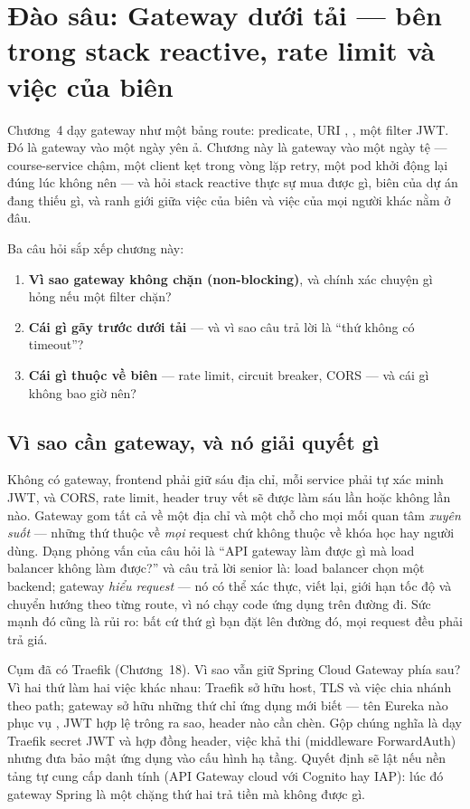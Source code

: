 \chapter{Đào sâu: Gateway dưới tải --- bên trong stack reactive, rate limit và việc của biên}
\label{ch:dd-gateway}

Chương~4 dạy gateway như một bảng route: predicate, URI ,
, một filter JWT. Đó là gateway vào một ngày yên ả.
Chương này là gateway vào một ngày tệ --- course-service chậm, một
client kẹt trong vòng lặp retry, một pod khởi động lại đúng lúc không
nên --- và hỏi stack reactive thực sự mua được gì, biên của dự án đang
thiếu gì, và ranh giới giữa việc của biên và việc của mọi người khác
nằm ở đâu.

Ba câu hỏi sắp xếp chương này:

\begin{enumerate}
  \item \textbf{Vì sao gateway không chặn (non-blocking)}, và chính
  xác chuyện gì hỏng nếu một filter chặn?
  \item \textbf{Cái gì gãy trước dưới tải} --- và vì sao câu trả lời là
  ``thứ không có timeout''?
  \item \textbf{Cái gì thuộc về biên} --- rate limit, circuit breaker,
  CORS --- và cái gì không bao giờ nên?
\end{enumerate}

\section{Vì sao cần gateway, và nó giải quyết gì}

Không có gateway, frontend phải giữ sáu địa chỉ, mỗi service phải tự
xác minh JWT, và CORS, rate limit, header truy vết sẽ được làm sáu lần
hoặc không lần nào. Gateway gom tất cả về một địa chỉ và một chỗ cho
mọi mối quan tâm \emph{xuyên suốt} --- những thứ thuộc về \emph{mọi}
request chứ không thuộc về khóa học hay người dùng. Dạng phỏng vấn của
câu hỏi là ``API gateway làm được gì mà load balancer không làm được?''
và câu trả lời senior là: load balancer chọn một backend; gateway
\emph{hiểu request} --- nó có thể xác thực, viết lại, giới hạn tốc độ
và chuyển hướng theo từng route, vì nó chạy code ứng dụng trên đường
đi. Sức mạnh đó cũng là rủi ro: bất cứ thứ gì bạn đặt lên đường đó, mọi
request đều phải trả giá.

\begin{decision}
Cụm đã có Traefik (Chương~18). Vì sao vẫn giữ Spring Cloud Gateway
phía sau? Vì hai thứ làm hai việc khác nhau: Traefik sở hữu host, TLS
và việc chia nhánh theo path; gateway sở hữu những thứ chỉ ứng dụng
mới biết --- tên Eureka nào phục vụ , JWT hợp lệ
trông ra sao, header nào cần chèn. Gộp chúng nghĩa là dạy Traefik
secret JWT và hợp đồng header, việc khả thi (middleware ForwardAuth)
nhưng đưa bảo mật ứng dụng vào cấu hình hạ tầng. Quyết định sẽ lật nếu
nền tảng tự cung cấp danh tính (API Gateway cloud với Cognito hay IAP):
lúc đó gateway Spring là một chặng thứ hai trả tiền mà không được gì.
\end{decision}

